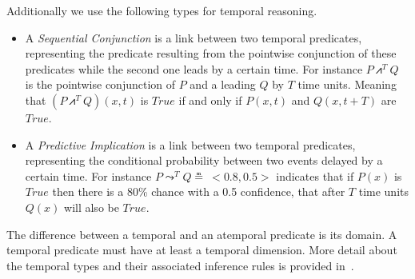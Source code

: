 \documentclass[runningheads]{llncs}
\newcommand{\TTrue}{\textit{True}}
\newcommand{\lpreimp}[1]{\leadsto^{#1}}
\newcommand{\lseqand}[1]{\!\bigslopedwedge^{#1}\!}
\begin{document}
Additionally we use the following types for temporal reasoning.
\begin{itemize}
\item A \emph{Sequential Conjunction} is a link between two temporal
  predicates, representing the predicate resulting from the pointwise
  conjunction of these predicates while the second one leads by a
  certain time.  For instance $P \lseqand{T} Q$ is the pointwise
  conjunction of $P$ and a leading $Q$ by $T$ time units.  Meaning
  that $(P \lseqand{T} Q)(x, t)$ is $\TTrue$ if and only if $P(x, t)$
  and $Q(x, t+T)$ are $\TTrue$.
\item A \emph{Predictive Implication} is a link between two temporal
  predicates, representing the conditional probability between two
  events delayed by a certain time.  For instance
  $P \lpreimp{T} Q \measeq\ <\!0.8, 0.5\!>$ indicates that if $P(x)$
  is $\TTrue$ then there is a 80\% chance with a 0.5 confidence, that
  after $T$ time units $Q(x)$ will also be $\TTrue$.
\end{itemize}
The difference between a temporal and an atemporal predicate is its
domain.  A temporal predicate must have at least a temporal dimension.
More detail about the temporal types and their associated inference
rules is provided in~\cite{Geisweiller2023TPLN}.

\end{document}
